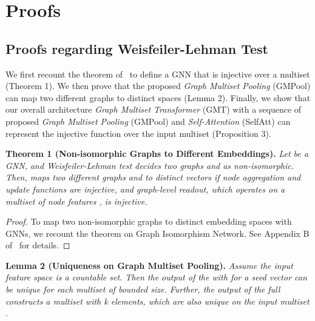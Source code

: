 \documentclass{article} \usepackage{iclr2021_conference,times}
\begin{document}



\newpage
\newpage

\appendix

\section{Proofs}

\subsection{Proofs regarding Weisfeiler-Lehman Test \label{appendix/wlproof}}
We first recount the theorem of~\citet{GIN} to define a GNN that is injective over a multiset (Theorem 1). We then prove that the proposed \emph{Graph Multiset Pooling} (GMPool) can map two different graphs to distinct spaces (Lemma 2). Finally, we show that our overall architecture \emph{Graph Multiset Transformer} (GMT) with a sequence of proposed \emph{Graph Multiset Pooling} (GMPool) and \emph{Self-Attention} (SelfAtt) can represent the injective function over the input multiset (Proposition 3).

\textbf{Theorem 1 (Non-isomorphic Graphs to Different Embeddings).} \emph{Let  be a GNN, and Weisfeiler-Lehman test decides two graphs  and  as non-isomorphic. Then,  maps two different graphs  and  to distinct vectors if node aggregation and update functions are injective, and graph-level readout, which operates on a multiset of node features , is injective.}

\begin{proof}
To map two non-isomorphic graphs to distinct embedding spaces with GNNs, we recount the theorem on Graph Isomorphism Network. See Appendix B of~\cite{GIN} for details.
\end{proof}

\textbf{Lemma 2 (Uniqueness on Graph Multiset Pooling).} \emph{Assume the input feature space  is a countable set. Then the output of the  with  for a seed vector  can be unique for each multiset  of bounded size. Further, the output of the full  constructs a multiset with k elements, which are also unique on the input multiset .}
\end{document}
